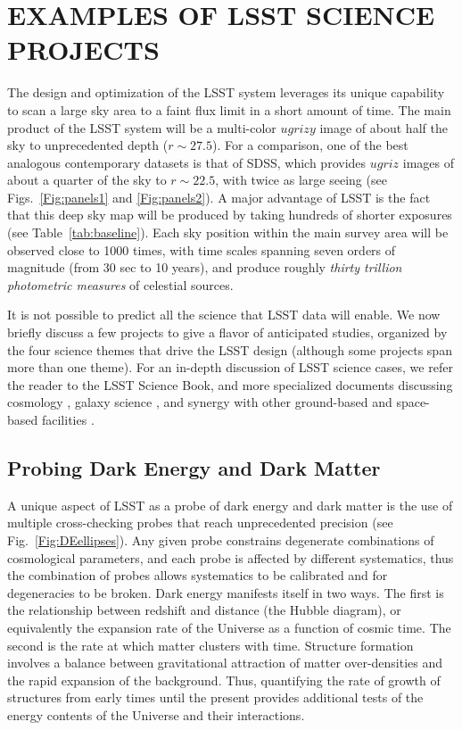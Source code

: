 
\section{EXAMPLES OF LSST SCIENCE PROJECTS}
\label{Sec:science}

The design and optimization of the LSST system leverages its unique capability
to scan a large sky area to a faint flux limit in a short amount of time.
The main product of the LSST system will be a multi-color $ugrizy$ image of about
half the sky to unprecedented depth ($r\sim27.5$). For a comparison,
one of the best
analogous contemporary datasets is that of SDSS, which provides $ugriz$ images
of about a quarter of the sky to $r\sim22.5$, with twice as large seeing
(see Figs.~\ref{Fig:panels1} and \ref{Fig:panels2}). A major advantage of LSST
is the fact that this deep sky map will be produced by taking hundreds of
shorter exposures (see Table~\ref{tab:baseline}). Each sky position within the main survey area
will be observed close to 1000 times, with time scales spanning seven orders of
magnitude (from 30 sec to 10 years), and produce roughly \textit{thirty
trillion photometric measures} of celestial sources.

It is not possible to predict all the science that LSST data will enable.
We now briefly discuss a few projects to give a flavor of anticipated studies,
organized by the four science themes that drive the LSST design
(although some projects span more than one theme).
For an in-depth discussion of LSST science cases, we refer the reader to the
LSST Science Book, and more specialized documents discussing cosmology
\citep{2012arXiv1211.0310L, 2018RPPh...81f6901Z}, galaxy science
\citep{2017arXiv170801617R}, and synergy with other ground-based and
space-based facilities
\citep{2016arXiv161001661N,2015arXiv150107897J,2017ApJS..233...21R}.

\subsection{Probing Dark Energy and Dark Matter }

A unique aspect of LSST as a probe of dark energy and dark matter is
the use of multiple cross-checking probes that reach unprecedented
precision (see Fig.~\ref{Fig:DEellipses}). Any given probe constrains
degenerate combinations of cosmological parameters, and each probe is
affected by different systematics, thus the combination of probes
allows systematics to be calibrated and for degeneracies to be
broken.  Dark energy manifests itself in two ways.  The first is the
relationship between redshift and distance (the Hubble diagram), or
equivalently the expansion rate of the Universe as a function of
cosmic time.  The second is the rate at which matter clusters with
time.
Structure formation involves a balance between
gravitational attraction of matter over-densities and the rapid
expansion of the background.  Thus, quantifying the rate of growth of
structures from early times until the present provides additional
tests of the energy contents of the Universe and their interactions.

